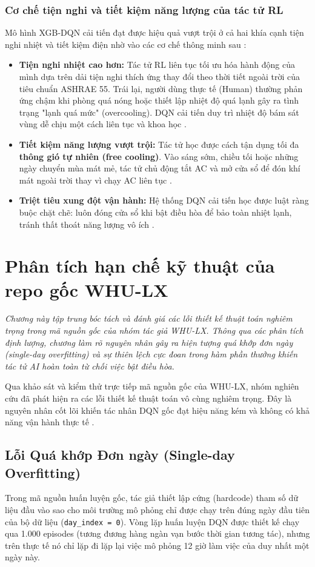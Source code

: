 \documentclass[12pt, a4paper]{report}
\begin{document}
\subsection{Cơ chế tiện nghi và tiết kiệm năng lượng của tác tử RL}
Mô hình XGB-DQN cải tiến đạt được hiệu quả vượt trội ở cả hai khía cạnh tiện nghi nhiệt và tiết kiệm điện nhờ vào các cơ chế thông minh sau \cite{whulx,ashrae55,dqn}:
\begin{itemize}
    \item \textbf{Tiện nghi nhiệt cao hơn:} Tác tử RL liên tục tối ưu hóa hành động của mình dựa trên dải tiện nghi thích ứng thay đổi theo thời tiết ngoài trời của tiêu chuẩn ASHRAE 55. Trái lại, người dùng thực tế (Human) thường phản ứng chậm khi phòng quá nóng hoặc thiết lập nhiệt độ quá lạnh gây ra tình trạng "lạnh quá mức" (overcooling). DQN cải tiến duy trì nhiệt độ bám sát vùng dễ chịu một cách liên tục và khoa học \cite{ashrae55,dqn}.
    \item \textbf{Tiết kiệm năng lượng vượt trội:} Tác tử học được cách tận dụng tối đa \textbf{thông gió tự nhiên (free cooling)}. Vào sáng sớm, chiều tối hoặc những ngày chuyển mùa mát mẻ, tác tử chủ động tắt AC và mở cửa sổ để đón khí mát ngoài trời thay vì chạy AC liên tục \cite{whulx,iea_buildings}.
    \item \textbf{Triệt tiêu xung đột vận hành:} Hệ thống DQN cải tiến học được luật ràng buộc chặt chẽ: luôn đóng cửa sổ khi bật điều hòa để bảo toàn nhiệt lạnh, tránh thất thoát năng lượng vô ích \cite{whulx}.
\end{itemize}

\chapter{Phân tích hạn chế kỹ thuật của repo gốc WHU-LX}

\textit{Chương này tập trung bóc tách và đánh giá các lỗi thiết kế thuật toán nghiêm trọng trong mã nguồn gốc của nhóm tác giả WHU-LX. Thông qua các phân tích định lượng, chương làm rõ nguyên nhân gây ra hiện tượng quá khớp đơn ngày (single-day overfitting) và sự thiên lệch cực đoan trong hàm phần thưởng khiến tác tử AI hoàn toàn từ chối việc bật điều hòa.}

Qua khảo sát và kiểm thử trực tiếp mã nguồn gốc của WHU-LX, nhóm nghiên cứu đã phát hiện ra các lỗi thiết kế thuật toán vô cùng nghiêm trọng. Đây là nguyên nhân cốt lõi khiến tác nhân DQN gốc đạt hiệu năng kém và không có khả năng vận hành thực tế \cite{whulx,dqn}.

\section{Lỗi Quá khớp Đơn ngày (Single-day Overfitting)}
Trong mã nguồn huấn luyện gốc, tác giả thiết lập cứng (hardcode) tham số dữ liệu đầu vào sao cho môi trường mô phỏng chỉ được chạy trên đúng ngày đầu tiên của bộ dữ liệu (\texttt{day\_index = 0}). Vòng lặp huấn luyện DQN được thiết kế chạy qua 1.000 episodes (tương đương hàng ngàn vạn bước thời gian tương tác), nhưng trên thực tế nó chỉ lặp đi lặp lại việc mô phỏng 12 giờ làm việc của duy nhất một ngày này.
\end{document}
